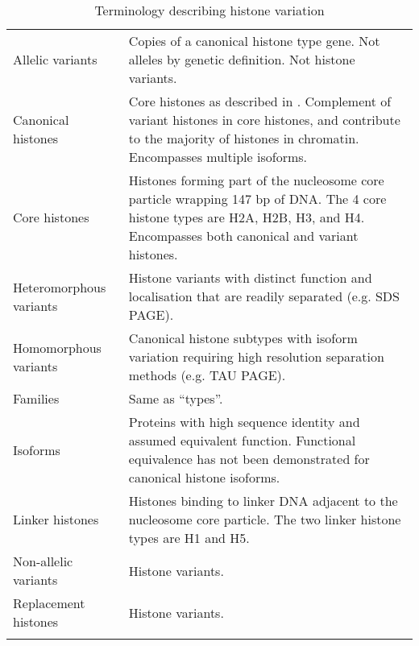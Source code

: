   \begin{table*}
    \caption{Terminology describing histone variation}
    \label{tab:histone-divisions}
    \centering
    \begin{tabular}{F p{\dimexpr(\textwidth--4\tabcolsep)}}
      \toprule
      Allelic variants &
      Copies of a canonical histone type gene. Not alleles by genetic definition. Not histone variants. \\
      \addlinespace

      Canonical histones &
      Core histones as described in .
      Complement of variant histones in core histones, and contribute to
      the majority of histones in chromatin.  Encompasses multiple
      isoforms. \\
      \addlinespace

      Core histones &
      Histones forming part of the nucleosome core particle wrapping 147 bp of DNA.
      The 4 core histone types are H2A, H2B, H3, and H4.
      Encompasses both canonical and variant histones. \\
      \addlinespace

      Heteromorphous variants &
      Histone variants with distinct function and localisation that are readily separated (e.g. SDS PAGE).\\
      \addlinespace

      Homomorphous variants &
      Canonical histone subtypes with isoform variation
      requiring high resolution separation methods (e.g. TAU PAGE).\\
      \addlinespace

      Families &
      Same as ``types''.\\
      \addlinespace

      Isoforms &
      Proteins with high sequence identity and assumed equivalent function.
      Functional equivalence has not been demonstrated for canonical histone isoforms.\\
      \addlinespace

      Linker histones &
      Histones binding to linker DNA adjacent to the nucleosome core particle.
      The two linker histone types are H1 and H5.\\
      \addlinespace

      Non-allelic variants &
      Histone variants. \\
      \addlinespace

      Replacement histones &
      Histone variants. \\
      \addlinespace


\end{tabular}
\end{table*}
